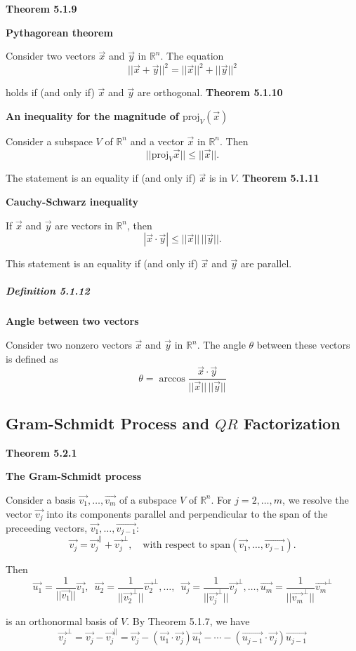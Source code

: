 \textbf{Theorem 5.1.9}\\
\par\noindent\textbf{Pythagorean theorem}
\par\noindent Consider two vectors $\vec{x}$ and $\vec{y}$ in $\mathbb{R}^{n}$. The equation
\[||\vec{x}+\vec{y}||^{2}=||\vec{x}||^{2}+||\vec{y}||^{2}\]
\par\noindent holds if (and only if) $\vec{x}$ and $\vec{y}$ are orthogonal.
\textbf{Theorem 5.1.10}\\
\par\noindent\textbf{An inequality for the magnitude of $\textrm{proj}_{V}(\vec{x})$}
\par\noindent Consider a subspace $V$ of $\mathbb{R}^{n}$ and a vector $\vec{x}$ in $\mathbb{R}^{n}$. Then
\[||\textrm{proj}_{V}\vec{x}||\le{}||\vec{x}||.\]
\par\noindent The statement is an equality if (and only if) $\vec{x}$ is in $V$.
\textbf{Theorem 5.1.11}\\
\par\noindent\textbf{Cauchy-Schwarz inequality}
\par\noindent If $\vec{x}$ and $\vec{y}$ are vectors in $\mathbb{R}^{n}$, then
\[|\vec{x}\cdot{}\vec{y}|\le{}||\vec{x}||\,||\vec{y}||.\]
\par\noindent This statement is an equality if (and only if) $\vec{x}$ and $\vec{y}$ are parallel.
\subparagraph*{Definition 5.1.12}
\par\noindent\textbf{Angle between two vectors}
\par\noindent Consider two nonzero vectors $\vec{x}$ and $\vec{y}$ in $\mathbb{R}^{n}$. The angle $\theta$ between these vectors is defined as
\[\theta{}=\arccos{}\frac{\vec{x}\cdot{}\vec{y}}{||\vec{x}||\,||\vec{y}||}\]

\subsection{Gram-Schmidt Process and $QR$ Factorization}
\textbf{Theorem 5.2.1}\\
\par\noindent\textbf{The Gram-Schmidt process}
\par\noindent Consider a basis $\vec{v_{1}},\ldots{},\vec{v_{m}}$ of a subspace $V$ of $\mathbb{R}^{n}$. For $j=2,\ldots{},m$, we resolve the vector $\vec{v_{j}}$ into its components parallel and perpendicular to the span of the preceeding vectors, $\vec{v_{1}},\ldots{},\vec{v_{j-1}}$:
\[\vec{v_{j}}=\vec{v_{j}}^{\parallel}+\vec{v_{j}}^{\perp},\quad{}\textrm{with respect to }\textrm{span}(\vec{v_{1}},\ldots{},\vec{v_{j-1}}).\]
\par\noindent Then
\[\vec{u_{1}}=\frac{1}{||\vec{v_{1}}||}\vec{v_{1}},\enspace{}\vec{u_{2}}=\frac{1}{||\vec{v_{2}}^{\perp}||}\vec{v_{2}}^{\perp},\ldots{},\enspace{}\vec{u_{j}}=\frac{1}{||\vec{v_{j}}^{\perp}||}\vec{v_{j}}^{\perp},\ldots{},\vec{u_{m}}=\frac{1}{||\vec{v_{m}}^{\perp}||}\vec{v_{m}}^{\perp}\]
\par\noindent is an orthonormal basis of $V$. By Theorem 5.1.7, we have
\[\vec{v_{j}}^{\perp}=\vec{v_{j}}-\vec{v_{j}}^{\parallel}=\vec{v_{j}}-(\vec{u_{1}}\cdot{}\vec{v_{j}})\vec{u_{1}}-\cdots{}-(\vec{u_{j-1}}\cdot{}\vec{v_{j}})\vec{u_{j-1}}\]
